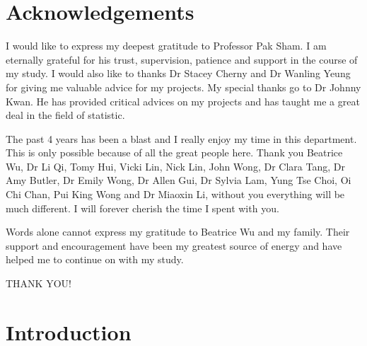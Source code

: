 \documentclass[12pt]{scrbook}
\begin{document}
	\chapter*{Acknowledgements}
	\vspace{1cm}
	I would like to express my deepest gratitude to Professor Pak Sham.
	I am eternally grateful for his trust, supervision, patience and support in the course of my study.
	I would also like to thanks Dr Stacey Cherny and Dr Wanling Yeung for giving me valuable advice for my projects.
	My special thanks go to Dr Johnny Kwan.
	He has provided critical advices on my projects and has taught me a great deal in the field of statistic.
	
	The past 4 years has been a blast and I really enjoy my time in this department.
	This is only possible because of all the great people here.
	Thank you Beatrice Wu, Dr Li Qi, Tomy Hui, Vicki Lin, Nick Lin, John Wong, Dr Clara Tang, Dr Amy Butler, Dr Emily Wong, Dr Allen Gui, Dr Sylvia Lam, Yung Tse Choi, Oi Chi Chan, Pui King Wong and Dr Miaoxin Li, without you everything will be much different.
	I will forever cherish the time I spent with you. 
	
	Words alone cannot express my gratitude to Beatrice Wu and my family.
	Their support and encouragement have been my greatest source of energy and have helped me to continue on with my study. 
	
	\begin{center}
	\large THANK YOU!
	\end{center}
	\cleardoublepage
	\begin{singlespace}
	\printglossary[title=Abbreviations,toctitle=Abbreviations,style=long,nonumberlist]
	\cleardoublepage
	
	\cleardoublepage
		\tableofcontents
		\listoffigures
		\listoftables
	\end{singlespace}
\mainmatter
\pagestyle{fancy}

\setlength{\parindent}{4em}
\setlength{\parskip}{0.75em}
	

	\chapter{Introduction}
\end{document}
